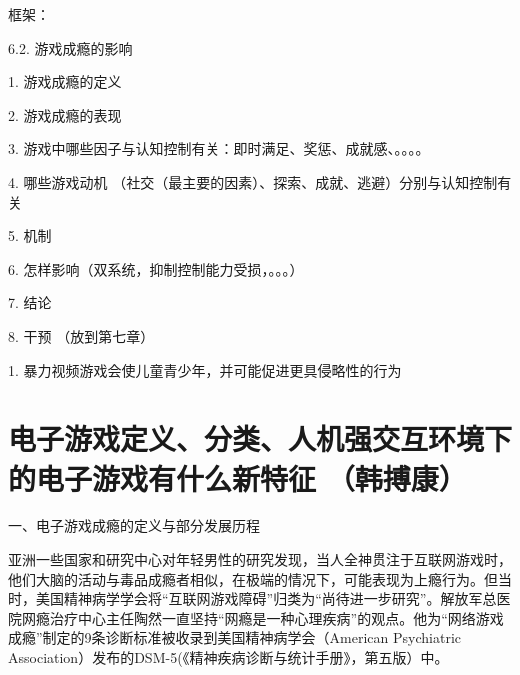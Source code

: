 \color{violet}


框架：

6.2. 游戏成瘾的影响

1. 游戏成瘾的定义

2. 游戏成瘾的表现

3. 游戏中哪些因子与认知控制有关：即时满足、奖惩、成就感、。。。。

4. 哪些游戏动机 （社交（最主要的因素）、探索、成就、逃避）分别与认知控制有关

5. 机制

6. 怎样影响（双系统，抑制控制能力受损，。。。）

7. 结论

8. 干预 （放到第七章）



1.  暴力视频游戏会使儿童青少年，并可能促进更具侵略性的行为





\section{电子游戏定义、分类、人机强交互环境下的电子游戏有什么新特征
（韩搏康）
}

一、电子游戏成瘾的定义与部分发展历程

亚洲一些国家和研究中心对年轻男性的研究发现，当人全神贯注于互联网游戏时，他们大脑的活动与毒品成瘾者相似，在极端的情况下，可能表现为上瘾行为。但当时，美国精神病学学会将“互联网游戏障碍”归类为“尚待进一步研究”。解放军总医院网瘾治疗中心主任陶然一直坚持“网瘾是一种心理疾病”的观点。他为“网络游戏成瘾”制定的9条诊断标准被收录到美国精神病学会（American Psychiatric Association）发布的DSM-5(《精神疾病诊断与统计手册》，第五版）中。

